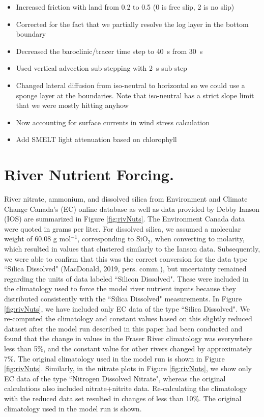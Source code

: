 \documentclass[draft,jgrga]{agutexSI2019}
\begin{document}
\begin{article}
\begin{itemize}
\item Increased friction with land from 0.2 to 0.5 (0 is free slip, 2 is no slip)
\item Corrected for the fact that we partially resolve the log layer in the bottom boundary
\item Decreased the baroclinic/tracer time step to 40~s from 30~s
\item Used vertical advection sub-stepping with 2~s sub-step
\item Changed lateral diffusion from iso-neutral to horizontal so we could use a sponge layer at
the boundaries. Note that iso-neutral has a strict slope limit that we were
mostly hitting anyhow
\item Now accounting for surface currents in wind stress calculation
\item Add SMELT light attenuation based on chlorophyll
\end{itemize}

\clearpage
\section{River Nutrient Forcing.} %
\label{sec:RivNuts}

River nitrate, ammonium, and dissolved silica from Environment and Climate Change Canada's (EC) online database \cite{dbECRivers} as well as data provided by Debby Ianson (IOS) are summarized in Figure \ref{fig:rivNuts}. 
The Environment Canada data were quoted in grams per liter. 
For dissolved silica, we assumed a molecular weight of 60.08 g mol$^{-1}$, corresponding to SiO$_2$, when converting to molarity, which resulted in values that clustered similarly to the Ianson data.
Subsequently, we were able to confirm that this was the correct conversion for the data type ``Silica Dissolved" (MacDonald, 2019, pers. comm.), but uncertainty remained regarding the units of data labeled ``Silicon Dissolved". These were included in the climatology used to force the model river nutrient inputs because they distributed consistently with the ``Silica Dissolved" measurements. 
In Figure \ref{fig:rivNuts}, we have included only EC data of the type ``Silica Dissolved". 
We re-computed the climatology and constant values based on this slightly reduced dataset after the model run described in this paper had been conducted and found that the change in values in the Fraser River climatology was everywhere less than 5\%, and the constant value for other rivers changed by approximately 7\%. 
The original climatology used in the model run is shown in Figure \ref{fig:rivNuts}.
Similarly, in the nitrate plots in Figure \ref{fig:rivNuts}, we show only EC data of the type ``Nitrogen Dissolved Nitrate", 
whereas the original calculations also included nitrate+nitrite data. 
Re-calculating the climatology with the reduced data set resulted in changes of less than 10\%. 
The original climatology used in the model run is shown. 


\end{article}
\end{document}
